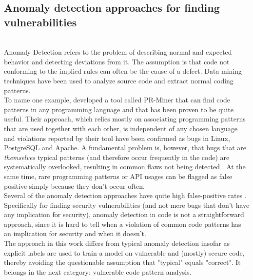 \documentclass[
a4paper,
pagesize,
pdftex,
12pt,
twoside, %
BCOR=5mm, %
ngerman,
fleqn,
final,
]{scrartcl}
\begin{document}
	\subsection{Anomaly detection approaches for finding vulnerabilities}\mbox{}\\
	Anomaly Detection refers to the problem of describing normal and expected behavior and detecting deviations from it. The assumption is that code not conforming to the implied rules can often be the cause of a defect. Data mining techniques have been used to analyze source code and extract normal coding patterns.\\
	To name one example, \cite{Li.2005} developed a tool called PR-Miner that can find code patterns in any programming language and that has been proven to be quite useful. Their approach, which relies mostly on associating programming patterns that are used together with each other, is independent of any chosen language and violations reported by their tool have been confirmed as bugs in Linux, PostgreSQL and Apache. A fundamental problem is, however, that bugs that are \textit{themselves} typical patterns (and therefore occur frequently in the code) are systematically overlooked, resulting in common flaws not being detected \cite{Yamaguchi.2012}. At the same time, rare programming patterns or API usages can be flagged as false positive simply because they don't occur often.\\
	Several of the anomaly detection approaches have quite high false-positive rates \citep{Ghaffarian.2017}. Specifically for finding security vulnerabilities (and not mere bugs that don't have any implication for security), anomaly detection in code is not a straightforward approach, since it is hard to tell when a violation of common code patterns has an implication for security and when it doesn't.\\
	The approach in this work differs from typical anomaly detection insofar as explicit labels are used to train a model on vulnerable and (mostly) secure code, thereby avoiding the questionable assumption that "typical" equals "correct". It belongs in the next category: vulnerable code pattern analysis. 
	
\end{document}
